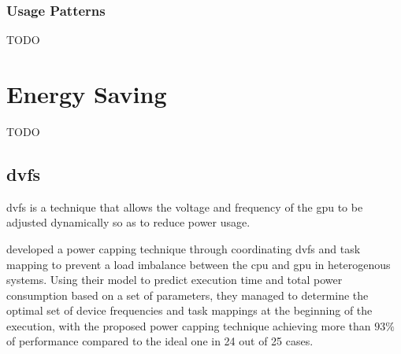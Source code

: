 			\subsubsection{Usage Patterns}
				TODO

	\section{Energy Saving}
		TODO

		\subsection{\acrlong{dvfs}}
			\gls{dvfs} is a technique that allows the voltage and frequency of the \gls{gpu} to be adjusted dynamically so as to reduce power usage.

			\textcite{Komoda2013} developed a power capping technique through coordinating \gls{dvfs} and task mapping to prevent a load imbalance between the \gls{cpu} and \gls{gpu} in heterogenous systems.
			Using their model to predict execution time and total power consumption based on a set of parameters, they managed to determine the optimal set of device frequencies and task mappings at the beginning of the execution, with the proposed power capping technique achieving more than $93 \%$ of performance compared to the ideal one in 24 out of 25 cases.